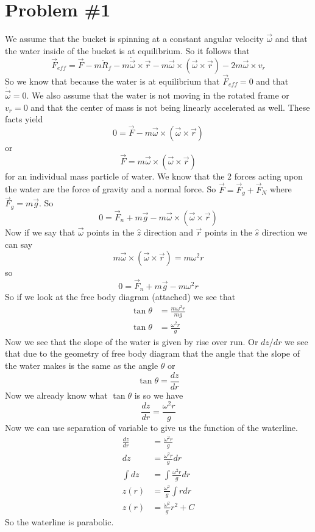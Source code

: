 \documentclass[11pt]{article}
\numberwithin{equation}{section}
\newcommand{\vecF}{\vec{F}}
\newcommand{\vecomg}{\vec{\omega}}
\begin{document}


\section{Problem \#1}
We assume that the bucket is spinning at a constant angular velocity $\vec{\omega}$ and that the water inside of the bucket is at equilibrium. So it follows that 
$$\vecF_{eff} = \vec{F}-m\ddot{R}_f-m\dot{\vecomg}\times\vec{r}-m\vecomg\times(\vecomg\times\vec{r})-2m\vecomg\times v_r$$
So we know that because the water is at equilibrium that $\vecF_{eff}=0$ and that $\dot{\vecomg}=0$. We also assume that the water is not moving in the rotated frame or $v_r=0$ and that the center of mass is not being linearly accelerated as well. These facts yield 
$$0 = \vec{F}-m\vecomg\times(\vecomg\times\vec{r})$$
or
$$\vec{F} = m\vecomg\times(\vecomg\times\vec{r})$$
for an individual mass particle of water. We know that the 2 forces acting upon the water are the force of gravity and a normal force. So $\vecF = \vecF_g+\vecF_N$ where $\vecF_g=m\vec{g}$. So
$$0 = \vecF_n +m\vec{g} -m\vecomg\times(\vecomg\times\vec{r})$$
Now if we say that $\vecomg$ points in the $\hat{z}$ direction and $\vec{r}$ points in the $\hat{s}$ direction we can say
$$m\vecomg\times(\vecomg\times\vec{r}) = m\omega^2r$$
so
$$0 = \vecF_n +m\vec{g} -m\omega^2r$$
So if we look at the free body diagram (attached) we see that 
\begin{align*}
\tan\theta &= \frac{m\omega^2r}{mg}\\
\tan\theta &= \frac{\omega^2r}{g}
\end{align*}
Now we see that the slope of the water is given by rise over run. Or $dz/dr$ we see that due to the geometry of free body diagram that the angle that the slope of the water makes is the same as the angle $\theta$ or
$$\tan\theta=\frac{dz}{dr}$$
Now we already know what $\tan\theta$ is so we have
$$\frac{dz}{dr} = \frac{\omega^2r}{g}$$
Now we can use separation of variable to give us the function of the waterline.
\begin{align*}
\frac{dz}{dr} &= \frac{\omega^2r}{g}\\
dz &= \frac{\omega^2r}{g}dr\\
\int dz &= \int\frac{\omega^2r}{g}dr\\
z(r) &= \frac{\omega^2}{g}\int rdr\\
z(r) &= \frac{\omega^2}{g}r^2+C
\end{align*}
So the waterline is parabolic.
\end{document}
